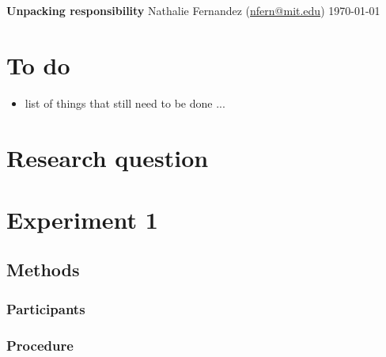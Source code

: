 \documentclass[11pt]{article}
\begin{document}
\begin{center} 
{\LARGE \textbf{Unpacking responsibility}}
\linebreak
\linebreak
{\large Nathalie Fernandez (\href{mailto:nfern@mit.edu}{nfern@mit.edu})}
\linebreak
\today
\end{center} 

\tableofcontents 
\clearpage 

\section{To do}
\label{sec:to_do}

\begin{itemize}
	\item list of things that still need to be done ... 
\end{itemize}

\clearpage 
\section{Research question}
\label{sec:research_question}

\section{Experiment 1}
\label{sec:experiment_1}

\subsection{Methods}
\label{sub:methods}

\subsubsection{Participants}
\label{ssub:participants}

\subsubsection{Procedure}
\label{ssub:procedure}
\end{document}
